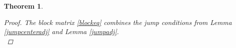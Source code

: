 \documentclass[12pt]{article}
\def\Z{{\mathbb Z}}
\newtheorem{theorem}{Theorem}
\begin{document}
\begin{theorem}




\begin{proof}
The block matrix \eqref{blockeq} combines the jump conditions from Lemma \ref{jumpcenteradj} and Lemma \ref{jumpadj}. \\










\end{proof}
\end{theorem}
\end{document}
